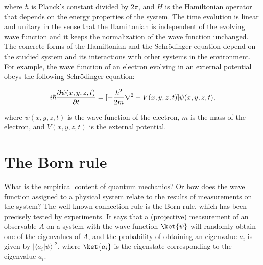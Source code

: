\noindent where $\hbar$ is Planck's constant divided by $2\pi$, and $H$ is the Hamiltonian operator that depends on the energy properties of the system. The time evolution is linear and unitary in the sense that the Hamiltonian is independent of the evolving wave function and it keeps the normalization of the wave function unchanged. The concrete forms of the Hamiltonian and the Schr\"{o}dinger equation depend on the studied system and its interactions with other systems in the environment. For example, the wave function of an electron evolving in an external potential obeys the following Schr\"{o}dinger equation:

\begin{equation}
i\hbar{\partial \psi(x,y,z,t) \over \partial t}=[-{\hbar^2 \over 2m}\nabla^2 +V(x,y,z,t)]\psi(x,y,z,t),
\label{Sch}
\end{equation}

\noindent where $\psi(x,y,z,t)$ is the wave function of the electron, $m$ is the mass of the electron, and $V(x,y,z,t)$ is the external potential. 

\section{The Born rule}

What is the empirical content of quantum mechanics? Or how does the wave function assigned to a physical system relate to the results of measurements on the system? The well-known connection rule is the Born rule, which has been precisely tested by experiments. It says that a (projective) measurement of an observable $A$ on a system with the wave function $\ket{\psi}$ will randomly obtain one of the eigenvalues of $A$, and the probability of obtaining an eigenvalue $a_i$ is given by $|\langle a_i | \psi \rangle|^2$, where $\ket{a_i}$ is the eigenstate corresponding to the eigenvalue $a_i$. 

